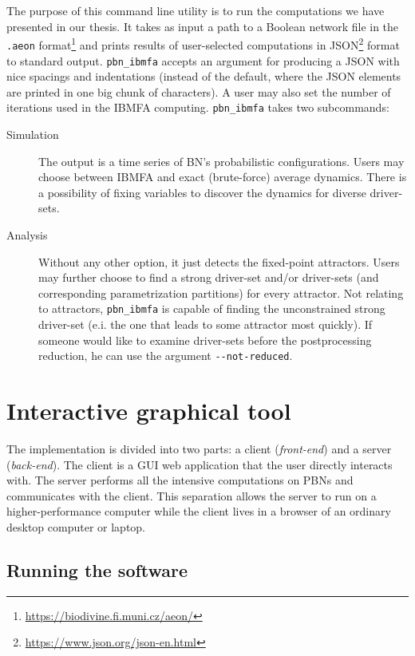 \documentclass[
	digital, oneside, nosansbold, nocolorbold, nolot, nolof
]{fithesis4}
\theoremstyle{definition}
\theoremstyle{definition}
\begin{document}
The purpose of this command line utility is to run the computations we have presented in our thesis. It takes as input a path to a Boolean network file in the \texttt{.aeon} format\footnote{\url{https://biodivine.fi.muni.cz/aeon/}} and prints results of user-selected computations in JSON\footnote{\url{https://www.json.org/json-en.html}} format to standard output. \texttt{pbn\_ibmfa} accepts an argument for producing a JSON with nice spacings and indentations (instead of the default, where the JSON elements are printed in one big chunk of characters). A user may also set the number of iterations used in the IBMFA computing. \texttt{pbn\_ibmfa} takes two subcommands:
\begin{description}
\item[Simulation] The output is a time series of BN's probabilistic
    configurations. Users may choose between IBMFA and exact (brute-force)
    average dynamics. There is a possibility of fixing variables to discover
    the dynamics for diverse driver-sets.
\item[Analysis] Without any other option, it just detects the fixed-point
    attractors. Users may further choose to find a strong driver-set and/or
    driver-sets (and corresponding parametrization partitions) for every
    attractor. Not relating to attractors, \texttt{pbn\_ibmfa} is capable of
    finding the unconstrained strong driver-set (e.i. the one that leads to
    some attractor most quickly). If someone would like to examine driver-sets
    before the postprocessing reduction, he can use the argument
    \verb|--not-reduced|.
\end{description}

\section{Interactive graphical tool}

The implementation is divided into two parts: a client (\emph{front-end}) and a
server (\emph{back-end}). The client is a GUI web application that the user
directly interacts with. The server performs all the intensive computations on
PBNs and communicates with the client. This separation allows the server to run
on a higher-performance computer while the client lives in a browser of an
ordinary desktop computer or laptop.

\subsection{Running the software}
\end{document}
